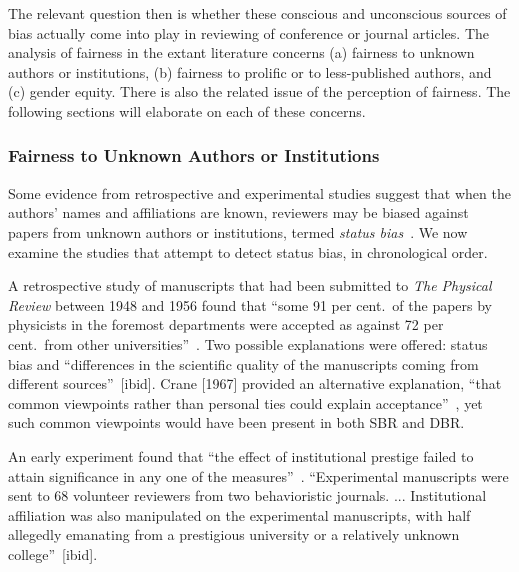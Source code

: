 \documentclass[acmtods,acmnow]{acmtrans2m}
\begin{document}
The relevant question then is whether these conscious and unconscious sources
of bias actually come into play in reviewing of conference or journal articles.
The analysis of fairness in the extant literature concerns (a) fairness to
unknown authors or institutions, (b) fairness to prolific or to less-published authors, and
(c) gender equity. There is also the related issue of the perception of
fairness. The following sections will elaborate on each of these concerns.

\subsubsection{Fairness to Unknown Authors or Institutions}

Some evidence from retrospective and experimental studies suggest that when
the authors' names and affiliations are known, reviewers may be biased
against papers from unknown authors or institutions, termed {\em \hbox{status}
bias}~\cite{cox93}. We now examine the studies that attempt to detect
status bias, in chronological order.

A retrospective study of manuscripts that had been submitted to {\em The Physical Review}
between 1948 and 1956 found that ``some 91 per cent.~of the papers by
physicists in the foremost departments were accepted as against 72 per
cent.~from other universities''~\cite[page 85]{zuckerman71}. Two possible
explanations were offered: status bias and ``differences in the scientific
quality of the manuscripts coming from different sources''~[ibid].  Crane
[1967] provided an alternative explanation, ``that common viewpoints rather
than personal ties could explain acceptance''~\cite[page~227]{dalton95}, yet
such common viewpoints would have been present in both SBR and DBR.

An early experiment found that ``the effect of institutional prestige failed
to attain significance in any one of the measures''~\cite[page
70]{mahoney78}.  ``Experimental manuscripts were sent to 68 volunteer
reviewers from two behavioristic journals. ... Institutional affiliation was
also manipulated on the experimental manuscripts, with half allegedly
emanating from a prestigious university or a relatively unknown
college''~[ibid].
\end{document}
